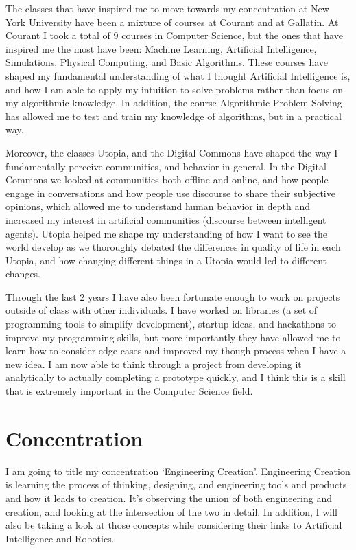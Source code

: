 \documentclass[11pt, oneside]{article}   	%
\begin{document}
\par The classes that have inspired me to move towards my concentration at New York University have been a mixture of courses at Courant and at Gallatin. At Courant I took a total of 9 courses in Computer Science, but the ones that have inspired me the most have been: Machine Learning, Artificial Intelligence, Simulations, Physical Computing, and Basic Algorithms. These courses have shaped my fundamental understanding of what I thought Artificial Intelligence is, and how I am able to apply my intuition to solve problems rather than focus on my algorithmic knowledge. In addition, the course Algorithmic Problem Solving has allowed me to test and train my knowledge of algorithms, but in a practical way.

\par Moreover, the classes Utopia, and the Digital Commons have shaped the way I fundamentally perceive communities, and behavior in general. In the Digital Commons we looked at communities both offline and online, and how people engage in conversations and how people use discourse to share their subjective opinions, which allowed me to understand human behavior in depth and increased my interest in artificial communities (discourse between intelligent agents). Utopia helped me shape my understanding of how I want to see the world develop as we thoroughly debated the differences in quality of life in each Utopia, and how changing different things in a Utopia would led to different changes.

\par Through the last 2 years I have also been fortunate enough to work on projects outside of class with other individuals. I have worked on libraries (a set of programming tools to simplify development), startup ideas, and hackathons to improve my programming skills, but more importantly they have allowed me to learn how to consider edge-cases and improved my though process when I have a new idea. I am now able to think through a project from developing it analytically to actually completing a prototype quickly, and I think this is a skill that is extremely important in the Computer Science field.

\section{Concentration}

\par I am going to title my concentration `Engineering Creation'. Engineering Creation is learning the process of thinking, designing, and engineering tools and products and how it leads to creation. It's observing the union of both engineering and creation, and looking at the intersection of the two in detail. In addition, I will also be taking a look at those concepts while considering their links to Artificial Intelligence and Robotics.
\end{document}
